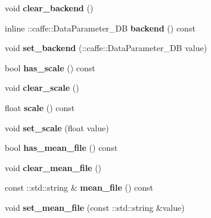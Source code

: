 \begin{DoxyCompactItemize}
void {\bfseries clear\+\_\+backend} ()
\item 
\mbox{\label{classcaffe_1_1_data_parameter_ae5cba94c4e054c850dcb558c0006df5c}} 
inline \+::caffe\+::\+Data\+Parameter\+\_\+\+DB {\bfseries backend} () const
\item 
\mbox{\label{classcaffe_1_1_data_parameter_a161a7432c46e6fc783d8a27eb64883c3}} 
void {\bfseries set\+\_\+backend} (\+::caffe\+::\+Data\+Parameter\+\_\+\+DB value)
\item 
\mbox{\label{classcaffe_1_1_data_parameter_ae3a356eb6f9c05e6b342e2cebdeee75c}} 
bool {\bfseries has\+\_\+scale} () const
\item 
\mbox{\label{classcaffe_1_1_data_parameter_a07bb1ea75348a98d9820bde90c6df484}} 
void {\bfseries clear\+\_\+scale} ()
\item 
\mbox{\label{classcaffe_1_1_data_parameter_a304d37464ebb9f1a6cd308eb937514b4}} 
float {\bfseries scale} () const
\item 
\mbox{\label{classcaffe_1_1_data_parameter_ab06436971c939b6c2b6897a5da2f5520}} 
void {\bfseries set\+\_\+scale} (float value)
\item 
\mbox{\label{classcaffe_1_1_data_parameter_a6751795ebc4eb4fda334200d57862006}} 
bool {\bfseries has\+\_\+mean\+\_\+file} () const
\item 
\mbox{\label{classcaffe_1_1_data_parameter_aa41558be220e467f96f3e91625904ea1}} 
void {\bfseries clear\+\_\+mean\+\_\+file} ()
\item 
\mbox{\label{classcaffe_1_1_data_parameter_a208ded07239d5bf76e884072ce0d46d7}} 
const \+::std\+::string \& {\bfseries mean\+\_\+file} () const
\item 
\mbox{\label{classcaffe_1_1_data_parameter_af7cd6caa8210cf0d081de2a2c5c4a451}} 
void {\bfseries set\+\_\+mean\+\_\+file} (const \+::std\+::string \&value)

\end{DoxyCompactItemize}
